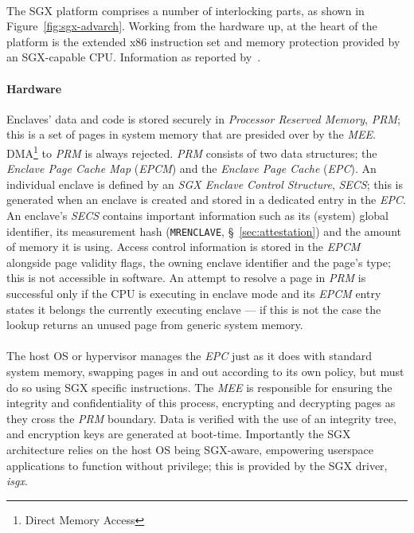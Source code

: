 \paragraph{} The SGX platform comprises a number of interlocking parts, as shown in Figure~\ref{fig:sgx-advarch}. Working from the hardware up, at the heart of the platform is the extended x86 instruction set and memory protection provided by an SGX-capable CPU. Information as reported by~\cite{sgx-sgx-reference,Costan2016IntelSE}.

\paragraph{Hardware} Enclaves' data and code is stored securely in \textit{Processor Reserved Memory}, \textit{PRM}; this is a set of pages in system memory that are presided over by the \textit{MEE}. DMA\footnote{Direct Memory Access} to \textit{PRM} is always rejected. \textit{PRM} consists of two data structures; the \textit{Enclave Page Cache Map} (\textit{EPCM}) and the \textit{Enclave Page Cache} (\textit{EPC}). An individual enclave is defined by an \textit{SGX Enclave Control Structure}, \textit{SECS}; this is generated when an enclave is created and stored in a dedicated entry in the \textit{EPC}. An enclave's \textit{SECS} contains important information such as its (system) global identifier, its measurement hash (\texttt{MRENCLAVE}, §~\ref{sec:attestation}) and the amount of memory it is using. Access control information is stored in the \textit{EPCM} alongside page validity flags, the owning enclave identifier and the page's type; this is not accessible in software. An attempt to resolve a page in \textit{PRM} is successful only if the CPU is executing in enclave mode and its \textit{EPCM} entry states it belongs the currently executing enclave --- if this is not the case the lookup returns an unused page from generic system memory.

\paragraph{} The host OS or hypervisor manages the \textit{EPC} just as it does with standard system memory, swapping pages in and out according to its own policy, but must do so using SGX specific instructions. The \textit{MEE} is responsible for ensuring the integrity and confidentiality of this process, encrypting and decrypting pages as they cross the \textit{PRM} boundary. Data is verified with the use of an integrity tree, and encryption keys are generated at boot-time. Importantly the SGX architecture relies on the host OS being SGX-aware, empowering userspace applications to function without privilege; this is provided by the SGX driver, \textit{isgx}.

